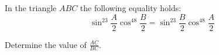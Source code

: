 In the triangle $ABC$ the following equality holds:\[\sin^{23}{\frac{A}{2}}\cos^{48}{\frac{B}{2}}=\sin^{23}{\frac{B}{2}}\cos^{48}{\frac{A}{2}}\]

Determine the value of $\frac{AC}{BC}$.